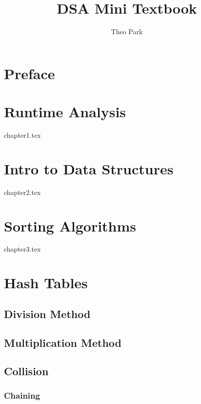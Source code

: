 \documentclass{report}
\title{DSA Mini Textbook}
\author{Theo Park}
\date{}
\begin{document}
\maketitle

\pagestyle{fancy}


\tableofcontents


\chapter*{Preface}


\chapter{Runtime Analysis}
{chapter1.tex}


\chapter{Intro to Data Structures}
{chapter2.tex}


\chapter{Sorting Algorithms}
{chapter3.tex}


\chapter{Hash Tables}

\section{Division Method}

\section{Multiplication Method}

\section{Collision}

\subsection{Chaining}
\end{document}
